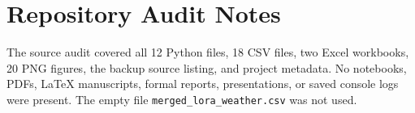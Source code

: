 \documentclass[conference]{IEEEtran}
\begin{document}
\appendices
\section{Repository Audit Notes}
The source audit covered all 12 Python files, 18 CSV files, two Excel workbooks, 20 PNG figures, the backup source listing, and project metadata. No notebooks, PDFs, LaTeX manuscripts, formal reports, presentations, or saved console logs were present. The empty file \texttt{merged\_lora\_weather.csv} was not used.
\end{document}
